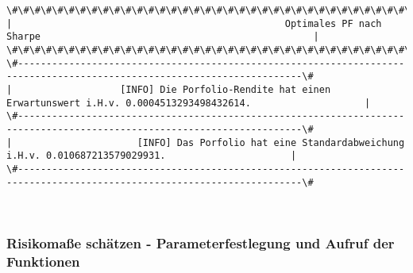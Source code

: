 \documentclass[paper=landscape]{scrartcl}
\begin{document}
    \begin{Verbatim}[commandchars=\\\{\}]
\#\#\#\#\#\#\#\#\#\#\#\#\#\#\#\#\#\#\#\#\#\#\#\#\#\#\#\#\#\#\#\#\#\#\#\#\#\#\#\#\#\#\#\#\#\#\#\#\#\#\#\#\#\#\#\#\#\#\#\#\#\#\#\#\#\#\#\#\#\#\#\#\#\#\#\#\#\#\#\#\#\#\#\#\#\#\#\#\#\#\#\#\#\#\#\#\#\#\#\#\#\#\#\#\#\#\#\#\#\#\#\#\#\#\#\#\#\#\#\#\#\#
|                                                Optimales PF nach Sharpe                                                | 
\#\#\#\#\#\#\#\#\#\#\#\#\#\#\#\#\#\#\#\#\#\#\#\#\#\#\#\#\#\#\#\#\#\#\#\#\#\#\#\#\#\#\#\#\#\#\#\#\#\#\#\#\#\#\#\#\#\#\#\#\#\#\#\#\#\#\#\#\#\#\#\#\#\#\#\#\#\#\#\#\#\#\#\#\#\#\#\#\#\#\#\#\#\#\#\#\#\#\#\#\#\#\#\#\#\#\#\#\#\#\#\#\#\#\#\#\#\#\#\#\#\#
\#------------------------------------------------------------------------------------------------------------------------\#
|                   [INFO] Die Porfolio-Rendite hat einen Erwartunswert i.H.v. 0.0004513293498432614.                    | 
\#------------------------------------------------------------------------------------------------------------------------\#
|                      [INFO] Das Porfolio hat eine Standardabweichung i.H.v. 0.010687213579029931.                      | 
\#------------------------------------------------------------------------------------------------------------------------\#

    \end{Verbatim}

    \begin{center}
    \end{center}
    { \hspace*{\fill} \\}
    
    \hypertarget{risikomauxdfe-schuxe4tzen---parameterfestlegung-und-aufruf-der-funktionen}{%
\subsubsection{Risikomaße schätzen - Parameterfestlegung und Aufruf der
Funktionen}\label{risikomauxdfe-schuxe4tzen---parameterfestlegung-und-aufruf-der-funktionen}}
\end{document}
